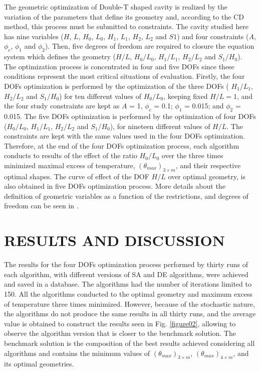 \documentclass[12pt,fleqn]{article}
\begin{document}
The geometric optimization of Double-T shaped cavity is realized by the variation of the parameters that define its geometry and, according to the CD method, this process must be submitted to constraints. The cavity studied here has nine variables ($H$, $L$, $H_{0}$, $L_{0}$, $H_{1}$, $L_{1}$, $H_{2}$, $L_{2}$ and $S1$) and four constraints ($A$, $\phi_{c}$, $\phi_{1}$ and $\phi_{2}$). Then, five degrees of freedom are required to closure the equation system which defines the geometry ($H/L$, $H_{0}/L_{0}$, $H_{1}/L_{1}$, $H_{2}/L_{2}$ and $S_{1}/H_{0}$). The optimization process is concentrated in four and five DOFs since these conditions represent the most critical situations of evaluation. Firstly, the four DOFs optimization is performed by the optimization of the three DOFs ( $H_{1}/L_{1}$, $H_{2}/L_{2}$ and $S_{1}/H_{0}$) for ten different values of $H_{0}/L_{0}$,  keeping fixed  $H/L = 1$, and the four study constraints are kept as $A$ = 1, $\phi_{c}$ = 0.1; $\phi_{1}$ = 0.015; and $\phi_{2}$ = 0.015. The five DOFs optimization is performed by the optimization of four DOFs ($H_{0}/L_{0}$, $H_{1}/L_{1}$, $H_{2}/L_{2}$ and $S_{1}/H_{0}$), for nineteen different values of $H/L$.  The constraints are kept with the same values used in the four  DOFs optimization. Therefore, at the end of the four  DOFs optimization process, each algorithm conducts to results of the effect of the ratio $H_{0}/L_{0}$ over the three times minimized maximal excess of temperature, $({\theta}_{max})_{3\times m}$, and their respective optimal shapes. The curve of effect of the DOF $H/L$ over optimal geometry, is also obtained in five DOFs optimization process. More details about the definition of geometric variables as a function of the restrictions, and degrees of freedom can be seen in \cite{Gonzales2015b}.

\section{RESULTS AND DISCUSSION}

The results for the four DOFs optimization process performed by thirty runs of each algorithm, with different versions of SA and DE algorithms, were achieved and saved in a database. The algorithms had the number of iterations limited to 150. All the algorithms conducted to the optimal geometry and maximum excess of temperature three times minimized. However, because of the stochastic nature, the algorithms do not produce the same results in all thirty runs, and the average value is obtained to construct the results seen in Fig. \ref{figure02}, allowing to observe the algorithm version that is closer to the benchmark solution. The benchmark solution is the composition of the best results achieved considering all algorithms and contains the minimum values of $({\theta}_{max})_{3\times m}$, $({\theta}_{max})_{4\times m}$, and its optimal geometries.
\end{document}
